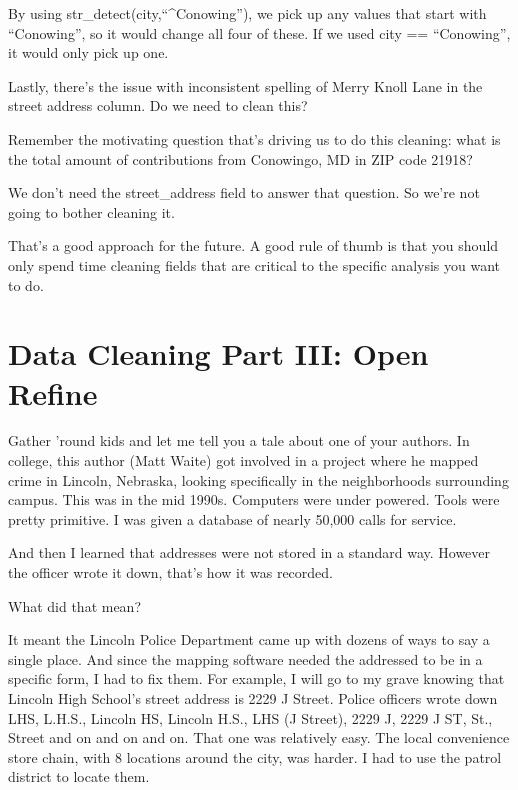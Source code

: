 \documentclass[
  letterpaper,
  DIV=11,
  numbers=noendperiod]{scrreprt}
\begin{document}
By using str\_detect(city,``\^{}Conowing''), we pick up any values that
start with ``Conowing'', so it would change all four of these. If we
used city == ``Conowing'', it would only pick up one.

Lastly, there's the issue with inconsistent spelling of Merry Knoll Lane
in the street address column. Do we need to clean this?

Remember the motivating question that's driving us to do this cleaning:
what is the total amount of contributions from Conowingo, MD in ZIP code
21918?

We don't need the street\_address field to answer that question. So
we're not going to bother cleaning it.

That's a good approach for the future. A good rule of thumb is that you
should only spend time cleaning fields that are critical to the specific
analysis you want to do.


\hypertarget{data-cleaning-part-iii-open-refine}{%
\chapter{Data Cleaning Part III: Open
Refine}\label{data-cleaning-part-iii-open-refine}}

Gather 'round kids and let me tell you a tale about one of your authors.
In college, this author (Matt Waite) got involved in a project where he
mapped crime in Lincoln, Nebraska, looking specifically in the
neighborhoods surrounding campus. This was in the mid 1990s. Computers
were under powered. Tools were pretty primitive. I was given a database
of nearly 50,000 calls for service.

And then I learned that addresses were not stored in a standard way.
However the officer wrote it down, that's how it was recorded.

What did that mean?

It meant the Lincoln Police Department came up with dozens of ways to
say a single place. And since the mapping software needed the addressed
to be in a specific form, I had to fix them. For example, I will go to
my grave knowing that Lincoln High School's street address is 2229 J
Street. Police officers wrote down LHS, L.H.S., Lincoln HS, Lincoln
H.S., LHS (J Street), 2229 J, 2229 J ST, St., Street and on and on and
on. That one was relatively easy. The local convenience store chain,
with 8 locations around the city, was harder. I had to use the patrol
district to locate them.
\end{document}
